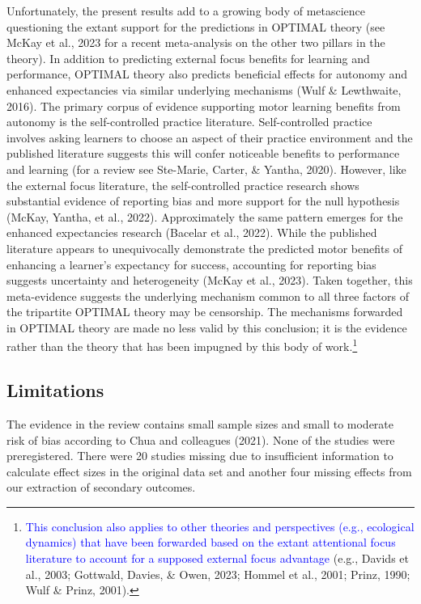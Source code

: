 \documentclass[
  man, donotrepeattitle,floatsintext]{apa7}
\begin{document}
Unfortunately, the present results add to a growing body of metascience questioning the extant support for the predictions in OPTIMAL theory (see McKay et al., 2023 for a recent meta-analysis on the other two pillars in the theory). In addition to predicting external focus benefits for learning and performance, OPTIMAL theory also predicts beneficial effects for autonomy and enhanced expectancies via similar underlying mechanisms (Wulf \& Lewthwaite, 2016). The primary corpus of evidence supporting motor learning benefits from autonomy is the self-controlled practice literature. Self-controlled practice involves asking learners to choose an aspect of their practice environment and the published literature suggests this will confer noticeable benefits to performance and learning (for a review see Ste-Marie, Carter, \& Yantha, 2020). However, like the external focus literature, the self-controlled practice research shows substantial evidence of reporting bias and more support for the null hypothesis (McKay, Yantha, et al., 2022). Approximately the same pattern emerges for the enhanced expectancies research (Bacelar et al., 2022). While the published literature appears to unequivocally demonstrate the predicted motor benefits of enhancing a learner's expectancy for success, accounting for reporting bias suggests uncertainty and heterogeneity (McKay et al., 2023). Taken together, this meta-evidence suggests the underlying mechanism common to all three factors of the tripartite OPTIMAL theory may be censorship. The mechanisms forwarded in OPTIMAL theory are made no less valid by this conclusion; it is the evidence rather than the theory that has been impugned by this body of work.\footnote{\textcolor{blue}{This conclusion also applies to other theories and perspectives (e.g., ecological dynamics) that have been forwarded based on the extant attentional focus literature to account for a supposed external focus advantage} (e.g., Davids et al., 2003; Gottwald, Davies, \& Owen, 2023; Hommel et al., 2001; Prinz, 1990; Wulf \& Prinz, 2001).}

\hypertarget{limitations}{%
\subsection{Limitations}\label{limitations}}

The evidence in the review contains small sample sizes and small to moderate risk of bias according to Chua and colleagues (2021). None of the studies were preregistered. There were 20 studies missing due to insufficient information to calculate effect sizes in the original data set and another four missing effects from our extraction of secondary outcomes.
\end{document}
